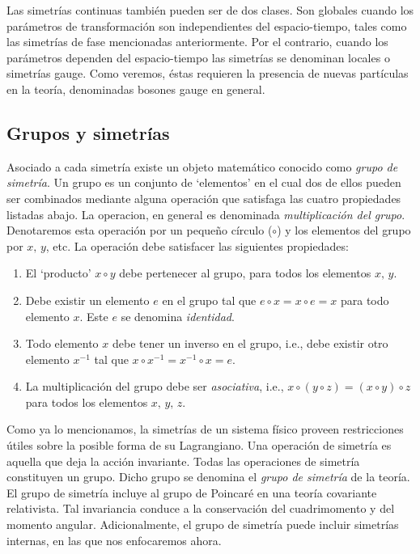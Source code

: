 Las simetrías continuas también pueden ser de dos clases. Son globales cuando los parámetros de transformación son independientes del espacio-tiempo, tales como las simetrías de fase mencionadas anteriormente. Por el contrario, cuando los parámetros dependen del espacio-tiempo las simetrías se denominan locales o simetrías gauge. Como veremos, éstas requieren la presencia de nuevas partículas en la teoría, denominadas bosones gauge en general.



\subsection{Grupos y simetrías}

Asociado a cada simetría existe un objeto matemático conocido como \emph{grupo de simetría}. Un grupo es un conjunto de `elementos' en el cual dos de ellos pueden ser combinados mediante alguna operación que satisfaga las cuatro propiedades listadas abajo. La operacion, en general es denominada \emph{multiplicación del grupo}. Denotaremos esta operación por un pequeño círculo ($\circ$) y los elementos del grupo por $x,\, y$, etc. La operación debe satisfacer las siguientes propiedades:

\begin{enumerate}
	\item El `producto' $x \circ y$ debe pertenecer al grupo, para todos los elementos $x,\, y$.
	
	\item Debe existir un elemento $e$ en el grupo tal que $e \circ x = x \circ e = x$ para todo elemento $x$. Este $e$ se denomina \emph{identidad}.
	
	\item Todo elemento $x$ debe tener un inverso en el grupo, i.e., debe existir otro elemento $x^{-1}$ tal que $x \circ x^{-1} = x^{-1} \circ x = e$.
	
	\item La multiplicación del grupo debe ser \emph{asociativa}, i.e., $x \circ (y \circ z) = (x \circ y) \circ z$ para todos los elementos $x,\, y,\, z$.
\end{enumerate}

Como ya lo mencionamos, la simetrías de un sistema físico proveen restricciones útiles sobre la posible forma de su Lagrangiano. Una operación de simetría es aquella que deja la acción invariante. Todas las operaciones de simetría constituyen un grupo. Dicho grupo se denomina el \emph{grupo de simetría} de la teoría. El grupo de simetría incluye al grupo de Poincaré en una teoría covariante relativista. Tal invariancia conduce a la conservación del cuadrimomento y del momento angular. Adicionalmente, el grupo de simetría puede incluir simetrías internas, en las que nos enfocaremos ahora.




